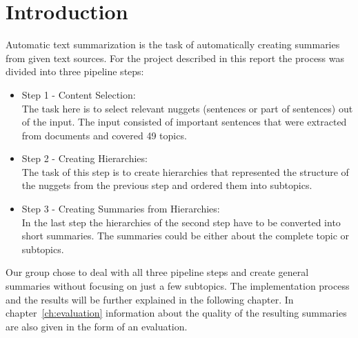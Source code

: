 
\section{Introduction}
Automatic text summarization is the task of automatically creating summaries from
given text sources. For the project described in this report the process was
divided into three pipeline steps:
\begin{itemize}
    \item Step 1 - Content Selection:  \\ The task here is to select relevant
        nuggets (sentences or part of sentences) out of the input. The
        input consisted of important sentences that were extracted from
        documents and covered 49 topics.
    \item Step 2 - Creating Hierarchies: \\ The task of this step is to create
        hierarchies that represented the structure of the nuggets from the
        previous step and ordered them into subtopics.
    \item Step 3 - Creating Summaries from Hierarchies: \\ In the last step the
        hierarchies of the second step have to be converted into short summaries.
        The summaries could be either about the complete topic or subtopics.
\end{itemize}
Our group chose to deal with all three pipeline steps and create general summaries
without focusing on just a few subtopics. The implementation process and
the results will be further explained in the following chapter. In
chapter~\ref{ch:evaluation} information about the quality of the resulting
summaries are also given in the form of an evaluation.